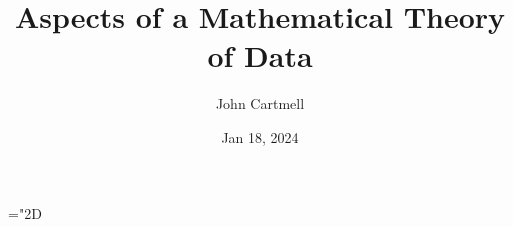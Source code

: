 
\usepackage{mathptmx}
\usepackage{amsfonts}
\usepackage{wasysym}
\usepackage{url}
\usepackage{hyperref}

\newcommand{\sharedmacros}{../../../SharedMacros}













\renewcommand{\erpictureFolder}[0]{../../../SharedPictures}
\setcounter{equation}{0}

\makeatletter
\newcommand{\xRightarrow}[2][]{\ext@arrow 0359\Rightarrowfill@{#1}{#2}}
\makeatother


\title[John Cartmell]{Aspects of a Mathematical Theory of Data}

\author{John Cartmell}
\institute{\\}
\date{Jan 18, 2024}

\usepackage{framed}
\usepackage{bibentry}
\usepackage{colortbl}
\usepackage{ulem}   %
\usepackage{soul,xcolor} %

\usepackage{listings}
\usepackage{arydshln} %
\usepackage{pst-arrow} %





\newcommand{\fgsourcediag}{$\binarysourcediag{a}{b}{c}{f}{g}$}
\newcommand{\rangeplus}{RR.5 range } %
\newcommand{\datacat}{$\gamma$-structured category}
\newcommand{\datacatw}{\datacat\ }
\mathchardef\localjchyphen="2D
\newtheorem{construction}[theorem]{Construction}

\newcommand{\IfSforGammaCwithRCwords}{
If $S$ is a sketch for \datacatw \catcw considered as a data specification with requirement $\reqtc$\ }
\newcommand{\IfSforGammaCwithRCwordsvariant}{
If $S$ is a sketch for \datacatw  \catcw and if $S$ is considered as a data specification with requirement $\reqtc$\ }



